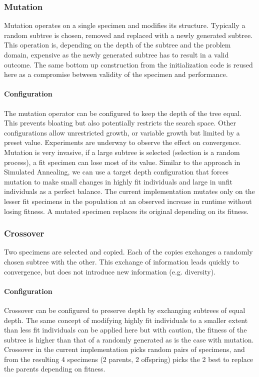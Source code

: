 \documentclass[10pt]{extarticle}
\begin{document}
\subsubsection{Mutation}
Mutation operates on a single specimen and modifies its structure. Typically a random subtree is chosen, removed and replaced with a newly generated subtree. 
This operation is, depending on the depth of the subtree and the problem domain, expensive as the newly generated subtree has to result in a valid outcome. The same bottom up construction from the initialization code is reused here as a compromise between validity of the specimen and performance.
\paragraph{Configuration}
The mutation operator can be configured to keep the depth of the tree equal. This prevents bloating but also potentially restricts the search space.
Other configurations allow unrestricted growth, or variable growth but limited by a preset value. Experiments are underway to observe the effect on convergence.
Mutation is very invasive, if a large subtree is selected (selection is a random process), a fit specimen can lose most of its value.
Similar to the approach in Simulated Annealing, we can use a target depth configuration that forces mutation to make small changes in highly fit individuals and large in unfit individuals as a perfect balance.
The current implementation mutates only on the lesser fit specimens in the population at an observed increase in runtime without losing fitness.
A mutated specimen replaces its original depending on its fitness.

\subsubsection{Crossover}
Two specimens are selected and copied. Each of the copies exchanges a randomly chosen subtree with the other. This exchange of information leads quickly to convergence, but does not introduce new information (e.g. diversity). 
\paragraph{Configuration}
Crossover can be configured to preserve depth by exchanging subtrees of equal depth. The same concept of modifying highly fit individuals to a smaller extent than less fit individuals can be applied here but with caution, the fitness of the subtree is higher than that of a randomly generated as is the case with mutation.
Crossover in the current implementation picks random pairs of specimens, and from the resulting 4 specimens (2 parents, 2 offspring) picks the 2 best to replace the parents depending on fitness.
\end{document}
